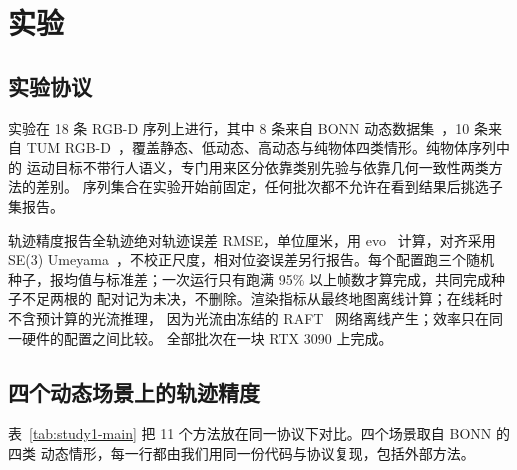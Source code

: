 \section{实验}
\label{sec:study1-exp}

\subsection{实验协议}

实验在 18 条 RGB-D 序列上进行，其中 8 条来自 BONN 动态数据集~\cite{bonn}，10 条来自
TUM RGB-D~\cite{tumrgbd}，覆盖静态、低动态、高动态与纯物体四类情形。纯物体序列中的
运动目标不带行人语义，专门用来区分依靠类别先验与依靠几何一致性两类方法的差别。
序列集合在实验开始前固定，任何批次都不允许在看到结果后挑选子集报告。

轨迹精度报告全轨迹绝对轨迹误差 RMSE，单位厘米，用 evo~\cite{evo} 计算，对齐采用
SE(3) Umeyama~\cite{umeyama}，不校正尺度，相对位姿误差另行报告。每个配置跑三个随机
种子，报均值与标准差；一次运行只有跑满 95\% 以上帧数才算完成，共同完成种子不足两根的
配对记为未决，不删除。渲染指标从最终地图离线计算；在线耗时不含预计算的光流推理，
因为光流由冻结的 RAFT~\cite{raft} 网络离线产生；效率只在同一硬件的配置之间比较。
全部批次在一块 RTX 3090 上完成。

\subsection{四个动态场景上的轨迹精度}

表~\ref{tab:study1-main} 把 11 个方法放在同一协议下对比。四个场景取自 BONN 的四类
动态情形，每一行都由我们用同一份代码与协议复现，包括外部方法。

